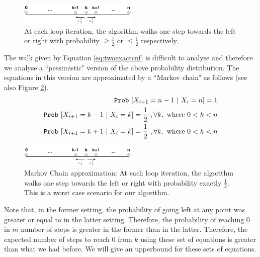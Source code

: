 \begin{figure}
\includegraphics[width=0.5\textwidth]{twocnfwalk}
\caption{At each loop iteration, the algorithm walks one step towards the left or right with probability $\geq \frac{1}{2}$ or $\leq \frac{1}{2}$ respectively.}
\label{fig:twocnfwalk}
\end{figure}

The walk given by Equation \ref{eq:twoexactcnf} is difficult to analyse and therefore we analyse a ``pessimistic" version of the above probability distribution. The equations in this version are approximated by a ``Markov chain" as follows (see also Figure \ref{fig:twoapproxcnfwalk}).
\begin{equation}
\label{eq:twocnf}
\begin{split}
\mathtt{Prob}~[X_{i+1} = n-1 ~|~ X_i = n] = 1 \\
\mathtt{Prob}~[X_{i+1} = k-1 ~|~ X_i = k] = \frac{1}{2} ~, \forall k, \text{ where } 0< k < n\\
\mathtt{Prob}~[X_{i+1} = k+1 ~|~ X_i = k] = \frac{1}{2}~, \forall k, \text{ where } 0< k < n
\end{split}
\end{equation}

\begin{figure}
\includegraphics[width=0.5\textwidth]{twoapproxcnfwalk}
\caption{Markov Chain approximation: At each loop iteration, the algorithm walks one step towards the left or right with probability exactly $\frac{1}{2}$. This is a worst case scenario for our algorithm.}
\label{fig:twoapproxcnfwalk}
\end{figure}

Note that, in the former setting, the probability of going left at any point was greater or equal to in the latter setting. Therefore, the probability of reaching $0$ in $m$ number of steps is greater in the former than in the latter. Therefore, the expected number of steps to reach $0$ from $k$ using these set of equations is greater than what we had before. We will give an upperbound for these sets of equations. 


